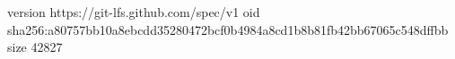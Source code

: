 version https://git-lfs.github.com/spec/v1
oid sha256:a80757bb10a8ebcdd35280472bcf0b4984a8cd1b8b81fb42bb67065c548dffbb
size 42827
